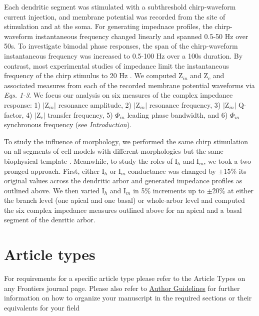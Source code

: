 \documentclass[utf8]{frontiersSCNS} %
\begin{document}
Each dendritic segment was stimulated with a subthreshold chirp-waveform current injection, and membrane potential
was recorded from the site of stimulation and at the soma. For generating impednace profiles, the chirp-waveform 
instantaneous frequency changed linearly and spanned 0.5-50 Hz over 50s. To investigate bimodal phase responses, the
span of the chirp-waveform instantaneous frequency was increased to 0.5-100 Hz over a 100s duration.  By contrast,
most experimental studies of impedance limit the instantaneous frequency of the chirp stimulus to 20 Hz 
\citep{Ulrich2002-dd, Dembrow2015-zb}.  We computed Z$_{in}$ and Z$_c$ and associated measures from each of the 
recorded membrane potential waveforms via \emph{Eqs. 1-3}.  We focus our analysis on six measures of the complex 
impedance response: 1) $|$Z$_{in}|$ resonance amplitude, 2) $|$Z$_{in}|$ resonance frequency,
3) $|$Z$_{in}|$ Q-factor, 4) $|$Z$_{c}|$ transfer frequency, 5) $\Phi_{in}$ leading phase bandwidth, 
and 6) $\Phi_{in}$ synchronous frequency (see \emph{Introduction}).

To study the influence of morphology, we performed the same chirp stimulation on all segments of cell models with
different morphologies but the same biophysical template \citep{Hay2011-if}.  Meanwhile, to study the roles of I$_h$ 
and I$_m$, we took a two pronged approach.  First, either I$_h$ or I$_m$ conductance was changed by $\pm$15\% its original
values across the dendritic arbor and generated impedance profiles as outlined above.  We then varied I$_h$ and I$_m$ in 5\%
increments up to $\pm$20\% at either the branch level (one apical and one basal) or whole-arbor level and computed the six 
complex impedance measures outlined above for an apical and a basal segment of the denritic arbor.


\section{Article types}

For requirements for a specific article type please refer to the Article Types on any Frontiers journal page. Please also refer to  \href{http://home.frontiersin.org/about/author-guidelines#Sections}{Author Guidelines} for further information on how to organize your manuscript in the required sections or their equivalents for your field

\end{document}

